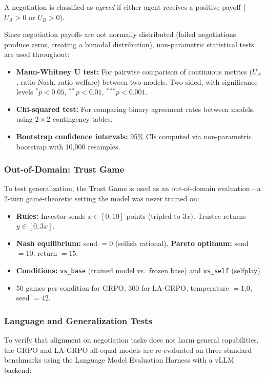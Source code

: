 \documentclass[12pt,a4paper]{article}
\begin{document}
A negotiation is classified as \textit{agreed} if either agent receives a positive payoff ($U_A > 0$ or $U_B > 0$).

Since negotiation payoffs are not normally distributed (failed negotiations produce zeros, creating a bimodal distribution), non-parametric statistical tests are used throughout:

\begin{itemize}
    \item \textbf{Mann-Whitney U test:} For pairwise comparison of continuous metrics ($U_A$, ratio Nash, ratio welfare) between two models. Two-sided, with significance levels $^* p < 0.05$, $^{**} p < 0.01$, $^{***} p < 0.001$.
    \item \textbf{Chi-squared test:} For comparing binary agreement rates between models, using $2 \times 2$ contingency tables.
    \item \textbf{Bootstrap confidence intervals:} 95\% CIs computed via non-parametric bootstrap with 10{,}000 resamples.
\end{itemize}

\subsubsection{Out-of-Domain: Trust Game}

To test generalization, the Trust Game is used as an out-of-domain evaluation---a 2-turn game-theoretic setting the model was never trained on:
\begin{itemize}
    \item \textbf{Rules:} Investor sends $x \in [0, 10]$ points (tripled to $3x$). Trustee returns $y \in [0, 3x]$.
    \item \textbf{Nash equilibrium:} send $= 0$ (selfish rational). \textbf{Pareto optimum:} send $= 10$, return $= 15$.
    \item \textbf{Conditions:} \texttt{vs\_base} (trained model vs.\ frozen base) and \texttt{vs\_self} (selfplay).
    \item 50 games per condition for GRPO, 300 for LA-GRPO, temperature $= 1.0$, seed $= 42$.
\end{itemize}

\subsubsection{Language and Generalization Tests}

To verify that alignment on negotiation tasks does not harm general capabilities, the GRPO and LA-GRPO all-equal models are re-evaluated on three standard benchmarks using the Language Model Evaluation Harness \citep{eval-harness} with a vLLM backend:
\end{document}
